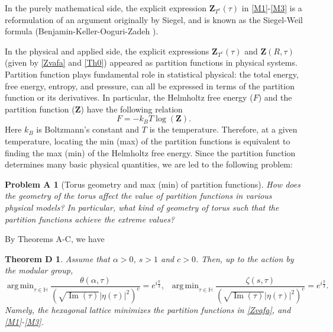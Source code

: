 \documentclass[reqno,english]{amsart}
\newtheorem*{thmD}{Theorem D}
\newtheorem{open problem}{Open Problem}[section]
\newtheorem{open question}{Open Question}[section]
\newtheorem{open questions on hexagonal lattice}{Open Questions on hexagonal lattice}[section]
\newtheorem*{problemA}{Problem A}
\renewcommand{\Im}{\operatorname{Im}}
\DeclareMathOperator*{\argmin}{arg\,min}
\begin{document}
In the purely mathematical side,
the explicit expression $\mathbf{Z}_{T^c}(\tau)$ in \eqref{M1}-\eqref{M3} is a reformulation of an argument originally by Siegel, and is
known as the Siegel-Weil formula (Benjamin-Keller-Ooguri-Zadeh \cite{Ben2022}).


In the physical and applied side, the explicit expressions $\mathbf{Z}_{T^c}(\tau)$ and $\mathbf{Z}(R,\tau)$ (given by \eqref{Zvafa} and \eqref{Th0}) appeared as partition functions in physical systems. Partition function plays fundamental role in statistical physical: the total energy, free energy, entropy, and pressure, can all be expressed in terms of the partition function or its derivatives. In particular, the Helmholtz free energy ($F$) and the partition function ($\mathbf{Z}$) have the following relation
$$
F=-k_{B}T\log(\mathbf{Z}).
$$
Here $k_B$ is Boltzmann's constant and $T$ is the temperature. Therefore, at a given temperature, locating the min (max) of the partition functions is equivalent to finding the max (min) of the Helmholtz free energy. Since the partition function determines many basic
physical quantities, we are led to the following problem:
\begin{problemA}[Torus geometry and max (min) of partition functions]  How does the geometry of the torus affect the value of partition functions in various physical models?
In particular, what kind of geometry of torus such that the partition functions achieve the extreme values?
\end{problemA}


By Theorems A-C, we have

\begin{thmD}\label{PropZ1}
Assume that $\alpha>0$, $s>1$ and $c>0$. Then, up to the action by the modular group,
$$\argmin_{\tau\in\mathbb{H}}\frac{\theta(\alpha,\tau)}{(\sqrt{\Im(\tau)}|\eta(\tau)|^2)^c}=e^{i\frac{\pi}{3}},\;\;
\argmin_{\tau\in\mathbb{H}}\frac{\zeta(s,\tau)}{(\sqrt{\Im(\tau)}|\eta(\tau)|^2)^c}=e^{i\frac{\pi}{3}}.$$
Namely, the hexagonal lattice minimizes the partition functions in \eqref{Zvafa}, and \eqref{M1}-\eqref{M3}.
\end{thmD}
\end{document}
